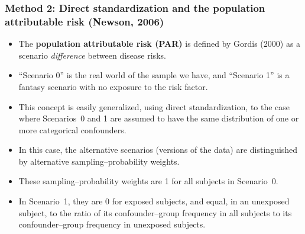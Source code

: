 \documentclass[11pt]{beamer}
\begin{document}
\begin{frame}
\frametitle{Method 2: Direct standardization and the population attributable risk
(Newson, 2006\cite{newson2006})}

\begin{itemize}

\item<2-> The \textbf{population attributable risk (PAR)} is defined by Gordis (2000)\cite{gordis2000}
as a scenario \textit{difference} between disease risks.

\item<3-> ``Scenario 0'' is the real world of the sample we have,
and ``Scenario 1'' is a fantasy scenario with no exposure to the risk factor.

\item<4-> This concept is easily generalized, using direct standardization,
to the case where Scenarios~0 and 1
are assumed to have the same distribution of one or more categorical confounders.

\item<5-> In this case, the alternative scenarios (versions of the data)
are distinguished by alternative sampling--probability weights.

\item<6-> These sampling--probability weights are 1 for all subjects in Scenario~0.

\item<7-> In Scenario~1, they are 0 for exposed subjects,
and equal, in an unexposed subject, to the ratio of its confounder--group frequency in all subjects
to its confounder--group frequency in unexposed subjects.

\end{itemize}

\end{frame}
\end{document}
